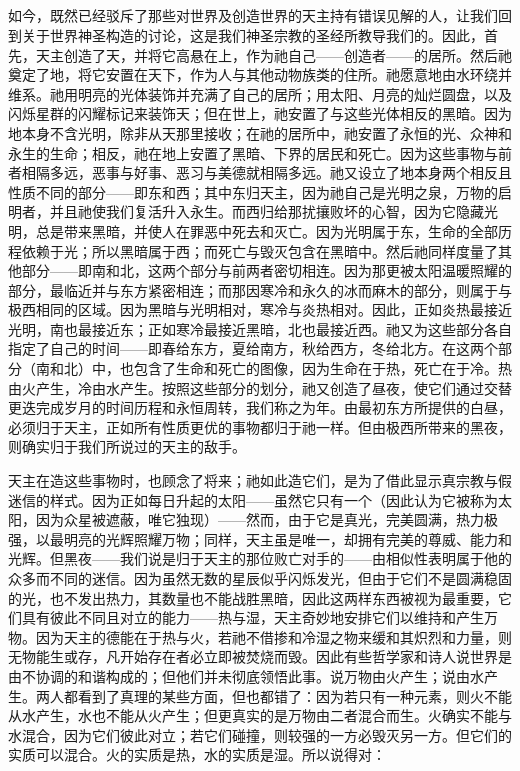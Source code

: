 
\subsection{}

如今，既然已经驳斥了那些对世界及创造世界的天主持有错误见解的人，让我们回到关于世界神圣构造的讨论，这是我们神圣宗教的圣经所教导我们的。因此，首先，天主创造了天，并将它高悬在上，作为祂自己——创造者——的居所。然后祂奠定了地，将它安置在天下，作为人与其他动物族类的住所。祂愿意地由水环绕并维系。祂用明亮的光体装饰并充满了自己的居所；用太阳、月亮的灿烂圆盘，以及闪烁星群的闪耀标记来装饰天；但在世上，祂安置了与这些光体相反的黑暗。因为地本身不含光明，除非从天那里接收；在祂的居所中，祂安置了永恒的光、众神和永生的生命；相反，祂在地上安置了黑暗、下界的居民和死亡。因为这些事物与前者相隔多远，恶事与好事、恶习与美德就相隔多远。祂又设立了地本身两个相反且性质不同的部分——即东和西；其中东归天主，因为祂自己是光明之泉，万物的启明者，并且祂使我们复活升入永生。而西归给那扰攘败坏的心智，因为它隐藏光明，总是带来黑暗，并使人在罪恶中死去和灭亡。因为光明属于东，生命的全部历程依赖于光；所以黑暗属于西；而死亡与毁灭包含在黑暗中。然后祂同样度量了其他部分——即南和北，这两个部分与前两者密切相连。因为那更被太阳温暖照耀的部分，最临近并与东方紧密相连；而那因寒冷和永久的冰而麻木的部分，则属于与极西相同的区域。因为黑暗与光明相对，寒冷与炎热相对。因此，正如炎热最接近光明，南也最接近东；正如寒冷最接近黑暗，北也最接近西。祂又为这些部分各自指定了自己的时间——即春给东方，夏给南方，秋给西方，冬给北方。在这两个部分（南和北）中，也包含了生命和死亡的图像，因为生命在于热，死亡在于冷。热由火产生，冷由水产生。按照这些部分的划分，祂又创造了昼夜，使它们通过交替更迭完成岁月的时间历程和永恒周转，我们称之为年。由最初东方所提供的白昼，必须归于天主，正如所有性质更优的事物都归于祂一样。但由极西所带来的黑夜，则确实归于我们所说过的天主的敌手。\par

天主在造这些事物时，也顾念了将来；祂如此造它们，是为了借此显示真宗教与假迷信的样式。因为正如每日升起的太阳——虽然它只有一个（因此认为它被称为太阳，因为众星被遮蔽，唯它独现）——然而，由于它是真光，完美圆满，热力极强，以最明亮的光辉照耀万物；同样，天主虽是唯一，却拥有完美的尊威、能力和光辉。但黑夜——我们说是归于天主的那位败亡对手的——由相似性表明属于他的众多而不同的迷信。因为虽然无数的星辰似乎闪烁发光，但由于它们不是圆满稳固的光，也不发出热力，其数量也不能战胜黑暗，因此这两样东西被视为最重要，它们具有彼此不同且对立的能力——热与湿，天主奇妙地安排它们以维持和产生万物。因为天主的德能在于热与火，若祂不借掺和冷湿之物来缓和其炽烈和力量，则无物能生或存，凡开始存在者必立即被焚烧而毁。因此有些哲学家和诗人说世界是由不协调的和谐构成的；但他们并未彻底领悟此事。说万物由火产生；说由水产生。两人都看到了真理的某些方面，但也都错了：因为若只有一种元素，则火不能从水产生，水也不能从火产生；但更真实的是万物由二者混合而生。火确实不能与水混合，因为它们彼此对立；若它们碰撞，则较强的一方必毁灭另一方。但它们的实质可以混合。火的实质是热，水的实质是湿。所以说得对：\par

